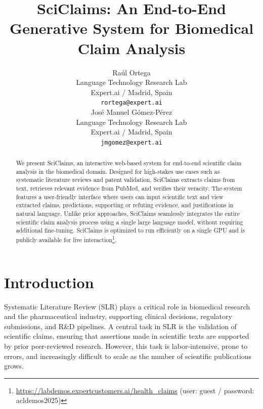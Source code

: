\documentclass[11pt]{article}
\title{SciClaims: An End-to-End Generative System for Biomedical Claim Analysis}
\author{Raúl Ortega \\
  Language Technology Research Lab \\
  Expert.ai / Madrid, Spain\\
  \texttt{rortega@expert.ai} \\\And
  José Manuel Gómez-Pérez \\
  Language Technology Research Lab \\
  Expert.ai / Madrid, Spain \\
  \texttt{jmgomez@expert.ai} \\}
\begin{document}
\maketitle
\begin{abstract}

We present SciClaims, an interactive web-based system for end-to-end scientific claim analysis in the biomedical domain. Designed for high-stakes use cases such as systematic literature reviews and patent validation, SciClaims extracts claims from text, retrieves relevant evidence from PubMed, and verifies their veracity. The system features a user-friendly interface where users can input scientific text and view extracted claims, predictions, supporting or refuting evidence, and justifications in natural language. Unlike prior approaches, SciClaims seamlessly integrates the entire scientific claim analysis process using a single large language model, without requiring additional fine-tuning. SciClaims is optimized to run efficiently on a single GPU and is publicly available for live interaction\footnote{\url{https://labdemos.expertcustomers.ai/health\_claims} (user: guest / password: acldemos2025)}. 
\end{abstract}

\section{Introduction}
Systematic Literature Review (SLR) plays a critical role in biomedical research and the pharmaceutical industry, supporting clinical decisions, regulatory submissions, and R\&D pipelines. A central task in SLR is the validation of scientific claims, ensuring that assertions made in scientific texts are supported by prior peer-reviewed research. However, this task is labor-intensive, prone to errors, and increasingly difficult to scale as the number of scientific publications grows.
\end{document}
